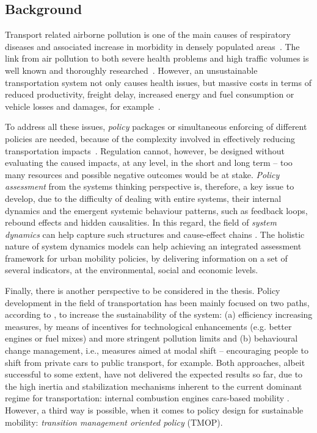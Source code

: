 \begin{multicols}{2}
\section{Background}
\label{s:background}
Transport related airborne pollution is one of the main causes of respiratory diseases and associated increase in morbidity in densely populated areas~\parencite{vimercati2011_Trafficrelatedair,who2006_Airqualityguidelines}. The link from air pollution to both severe health problems and high traffic volumes is well known and thoroughly researched~\parencite{who2006_Airqualityguidelines}. However, an unsustainable transportation system not only causes health issues, but massive costs in terms of reduced productivity, freight delay, increased energy and fuel consumption or vehicle losses and damages, for example~\parencite{li-zeng2012_SocialCostTraffic}.

To address all these issues, \textit{policy} packages or simultaneous enforcing of different policies are needed, because of the complexity involved in effectively reducing transportation impacts~\parencite[ch. 3, p. 45]{garciasierra2014_Travelbehaviourenvironmental}. Regulation cannot, however, be designed without evaluating the caused impacts, at any level, in the short and long term -- too many resources and possible negative outcomes would be at stake. \textit{Policy assessment} from the systems thinking perspective is, therefore, a key issue to develop, due to the difficulty of dealing with entire systems, their internal dynamics and the emergent systemic behaviour patterns, such as feedback loops, rebound effects and hidden causalities. In this regard, the field of \textit{system dynamics} can help capture such structures and cause-effect chains \parencite{hjorth2006_Navigatingtowardssustainable}. The holistic nature of system dynamics models can help achieving an integrated assessment framework for urban mobility policies, by delivering information on a set of several indicators, at the environmental, social and economic levels.

Finally, there is another perspective to be considered in the thesis. Policy development in the field of transportation has been mainly focused on two paths, according to \textcite{koehler2009_transitionsmodelsustainable}, to increase the sustainability of the system: (a) efficiency increasing measures, by means of incentives for technological enhancements (e.g. better engines or fuel mixes) and more stringent pollution limits and (b) behavioural change management, i.e., measures aimed at modal shift -- encouraging people to shift from private cars to public transport, for example. Both approaches, albeit successful to some extent, have not delivered the expected results so far, due to the high inertia and stabilization mechanisms inherent to the current dominant regime for transportation: internal combustion engines cars-based mobility \parencite{geels2012_AutomobilityTransitionSocio}. However, a third way is possible, when it comes to policy design for sustainable mobility: \textit{transition management oriented policy} (TMOP).


\end{multicols}
